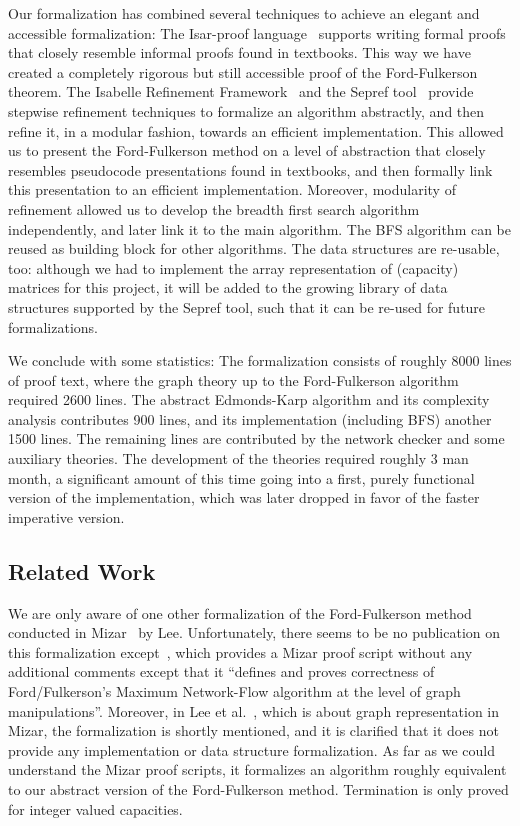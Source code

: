 \documentclass{llncs}
\begin{document}
  Our formalization has combined several techniques to achieve an elegant and accessible formalization: The Isar-proof language~\cite{Wenzel99}
  supports writing formal proofs that closely resemble informal proofs found in textbooks. This way we have created a completely rigorous but 
  still accessible proof of the Ford-Fulkerson theorem. The Isabelle Refinement Framework~\cite{LaTu12,La12} and the Sepref tool~\cite{La15,La16} 
  provide stepwise refinement techniques to formalize an algorithm abstractly, and then refine it, in a modular fashion, towards an efficient implementation. 
  This allowed us to present the Ford-Fulkerson method on a level 
  of abstraction that closely resembles pseudocode presentations found in textbooks, and then formally link this presentation to an efficient
  implementation. Moreover, modularity of refinement allowed us to develop the breadth first search algorithm independently, and later link it to the 
  main algorithm. The BFS algorithm can be reused as building block for other algorithms. The data structures are re-usable, too: although we had to implement the array representation of (capacity) matrices for this project, it will be added to the growing library of data structures 
  supported by the Sepref tool, such that it can be re-used for future formalizations.
  
  We conclude with some statistics:
  The formalization consists of roughly 8000 lines of proof text, where the graph theory up to the Ford-Fulkerson algorithm required 2600 lines.
  The abstract Edmonds-Karp algorithm and its complexity analysis contributes 900 lines, and its implementation (including BFS) another 1500 lines.
  The remaining lines are contributed by the network checker and some auxiliary theories. The development of the theories required roughly 3 man month, a significant amount of this time going into a first, purely functional version of the implementation, which was later dropped in favor of the faster imperative version.
  
  
  \subsection{Related Work}\label{sec:related_work}
  We are only aware of one other formalization of the Ford-Fulkerson method conducted in Mizar~\cite{MaRu05} by Lee. Unfortunately, there seems to be no publication
  on this formalization except~\cite{Lee05}, which provides a Mizar proof script without any additional comments except that it ``defines and proves correctness of Ford/Fulkerson's Maximum Network-Flow algorithm at the level of graph manipulations''. Moreover, in Lee et al.~\cite{LeRu07}, which is about graph representation in Mizar, the formalization is shortly mentioned, and it is clarified that it does not provide any implementation or data structure formalization.
  As far as we could understand the Mizar proof scripts, it formalizes an algorithm roughly equivalent to our abstract version of the Ford-Fulkerson method.
  Termination is only proved for integer valued capacities.
  
\end{document}
